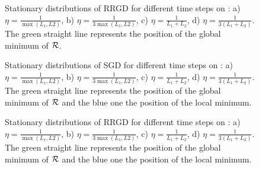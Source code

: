 \begin{figure}[h!]
	\centering
	\scalebox{0.45}{}
	\caption{Stationary distributions of RRGD for different time steps on \exOne: a) $\eta=\frac{1}{\max(L_1,L2)}$, b) $\eta=\frac{1}{3\max(L_1,L2)}$, c) $\eta=\frac{1}{L_1+L_2}$, d) $\eta=\frac{1}{3(L_1+L_2)}$. The green straight line represents the position of the global minimum of $\mathcal{R}$.}
	\label{RRGD_ex1}
\end{figure}

\begin{figure}[h!]
	\centering
	\scalebox{0.45}{}
	\caption{Stationary distributions of SGD for different time steps on \exTwo: a) $\eta=\frac{1}{\max(L_1,L2)}$, b) $\eta=\frac{1}{3\max(L_1,L2)}$, c) $\eta=\frac{1}{L_1+L_2}$, d) $\eta=\frac{1}{3(L_1+L_2)}$. The green straight line represents the position of the global minimum of $\mathcal{R}$ and the blue one the position of the local minimum.}
	\label{sgd_ex2}
\end{figure}

\begin{figure}[h!]
	\centering
	\scalebox{0.45}{}
	\caption{Stationary distributions of RRGD for different time steps on \exTwo: a) $\eta=\frac{1}{\max(L_1,L2)}$, b) $\eta=\frac{1}{3\max(L_1,L2)}$, c) $\eta=\frac{1}{L_1+L_2}$, d) $\eta=\frac{1}{3(L_1+L_2)}$. The green straight line represents the position of the global minimum of $\mathcal{R}$ and the blue one the position of the local minimum.}
	\label{RRGD_ex2}
\end{figure}

